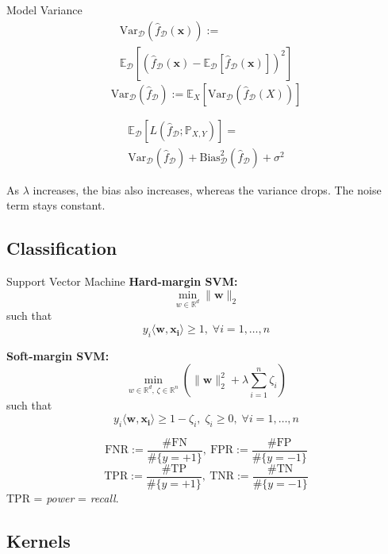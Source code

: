 \documentclass[a4paper,11pt]{article}
\def\R{\mathbb{R}}
\def\P{\mathbb{P}}
\def\E{\mathbb{E}}
\begin{document}
\begin{subbox}{Model Variance}
    \begin{multline*}
        \text{Var}_\mathcal{D} \left( \hat{f}_\mathcal{D}(\mathbf{x}) \right) :=\\ \E_\mathcal{D} \left[ \left( \hat{f}_\mathcal{D}(\mathbf{x}) - \E_\mathcal{D} \left[ \hat{f}_\mathcal{D}(\mathbf{x}) \right] \right)^2 \right]
    \end{multline*}
    \[
        \text{Var}_\mathcal{D} \left( \hat{f}_\mathcal{D} \right) := \E_X \left[ \text{Var}_\mathcal{D} \left( \hat{f}_\mathcal{D}(X) \right) \right]
    \]
\end{subbox}

\begin{multline*}
    \E_\mathcal{D} \left[ L \left( \hat{f}_\mathcal{D}; \P_{X, Y} \right) \right] =\\ \text{Var}_\mathcal{D} \left( \hat{f}_\mathcal{D} \right) + \text{Bias}_\mathcal{D}^2 \left( \hat{f}_\mathcal{D} \right) + \sigma^2
\end{multline*}

As \( \lambda \) increases, the bias also increases, whereas the variance drops. The noise term stays constant.


\subsection*{Classification}

\begin{mainbox}{Support Vector Machine}
    \textbf{Hard-margin SVM:} \[
        \min_{w \in \R^d} \lVert \mathbf{w} \rVert_2
    \] such that \[
        y_i \langle \mathbf{w}, \mathbf{x_i} \rangle \geq 1, \; \forall i = 1, \dots, n
    \]

    \textbf{Soft-margin SVM:} \[
        \min_{w \in \R^d, \, \zeta \in \R^n} \left( \lVert \mathbf{w} \rVert_2^2 + \lambda \sum_{i = 1}^n \zeta_i \right)
    \] such that \[
        y_i \langle \mathbf{w}, \mathbf{x_i} \rangle \geq 1 - \zeta_i, \; \zeta_i \geq 0, \; \forall i = 1, \dots, n
    \]
\end{mainbox}

\[
    \text{FNR} := \frac{\text{\#FN}}{\text{\#}\{y = +1\}}, \ \text{FPR} := \frac{\text{\#FP}}{\text{\#}\{y = -1\}}
\]
\[
    \text{TPR}  := \frac{\text{\#TP}}{\text{\#}\{y = +1\}}, \ \text{TNR} := \frac{\text{\#TN}}{\text{\#}\{y = -1\}}
\]
TPR = \emph{power} = \emph{recall}.


\subsection*{Kernels}
\end{document}
